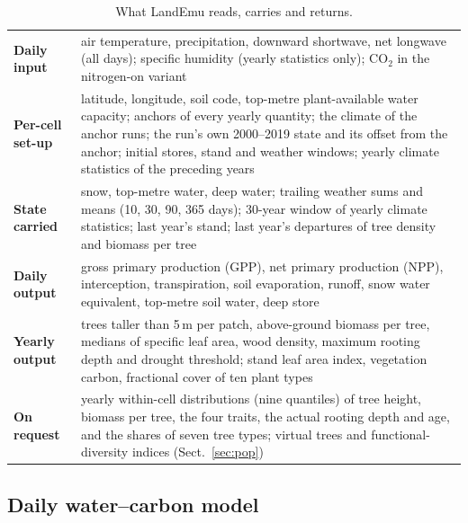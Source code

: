 \documentclass[11pt,a4paper]{article}
\begin{document}
\begin{table}[!tbp]
\centering
\caption{What LandEmu reads, carries and returns.}\label{tab:io}
\small
\begin{tabularx}{\textwidth}{@{}lX@{}}
\toprule
\textbf{Daily input} & air temperature, precipitation, downward shortwave, net longwave (all days); specific humidity
(yearly statistics only); CO$_2$ in the nitrogen-on variant \\
\textbf{Per-cell set-up} & latitude, longitude, soil code, top-metre plant-available water capacity; anchors of every
yearly quantity; the climate of the anchor runs; the run's own 2000--2019 state and its offset from the anchor; initial
stores, stand and weather windows; yearly climate statistics of the preceding years \\
\textbf{State carried} & snow, top-metre water, deep water; trailing weather sums and means (10, 30, 90, 365 days);
30-year window of yearly climate statistics; last year's stand; last year's departures of tree density and biomass per
tree \\
\textbf{Daily output} & gross primary production (GPP), net primary production (NPP), interception, transpiration, soil
evaporation, runoff, snow water equivalent, top-metre soil water, deep store \\
\textbf{Yearly output} & trees taller than 5\,m per patch, above-ground biomass per tree, medians of specific leaf area,
wood density, maximum rooting depth and drought threshold; stand leaf area index, vegetation carbon, fractional cover
of ten plant types \\
\textbf{On request} & yearly within-cell distributions (nine quantiles) of tree height, biomass per tree, the four
traits, the actual rooting depth and age, and the shares of seven tree types; virtual trees and functional-diversity
indices (Sect.~\ref{sec:pop}) \\
\bottomrule
\end{tabularx}
\end{table}

\subsection{Daily water--carbon model}\label{sec:daily}
\end{document}
